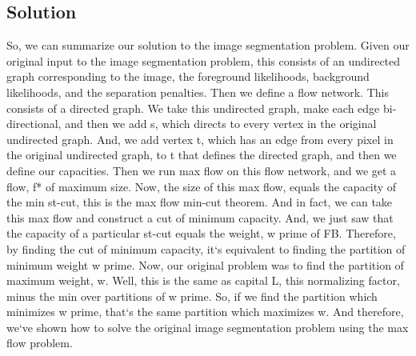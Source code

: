 \subsection{Solution}
So, we can summarize our solution to the image segmentation problem.
Given our original input to the image segmentation problem, this consists of an undirected graph corresponding to the image, the foreground likelihoods, background likelihoods, and the separation penalties.
Then we define a flow network.
This consists of a directed graph.
We take this undirected graph, make each edge bi-directional, and then we add s, which directs to every vertex in the original undirected graph.
And, we add vertex t, which has an edge from every pixel in the original undirected graph, to t that defines the directed graph, and then we define our capacities.
Then we run max flow on this flow network, and we get a flow, f* of maximum size.
Now, the size of this max flow, equals the capacity of the min st-cut, this is the max flow min-cut theorem.
And in fact, we can take this max flow and construct a cut of minimum capacity.
And, we just saw that the capacity of a particular st-cut equals the weight, w prime of FB\@.
Therefore, by finding the cut of minimum capacity, it`s equivalent to finding the partition of minimum weight w prime.
Now, our original problem was to find the partition of maximum weight, w.
Well, this is the same as capital L, this normalizing factor, minus the min over partitions of w prime.
So, if we find the partition which minimizes w prime, that`s the same partition which maximizes w.
And therefore, we`ve shown how to solve the original image segmentation problem using the max flow problem.

